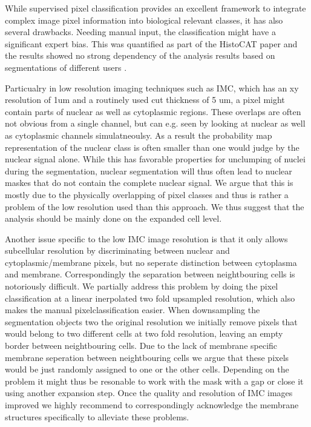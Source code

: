 \documentclass[a4paper]{article}
\begin{document}
While supervised pixel classification provides an excellent framework to integrate complex image
pixel information into biological relevant classes, it has also several drawbacks. Needing manual
input, the classification  might have a significant expert bias. This was quantified as part of the
HistoCAT paper and the results showed no strong dependency of the analysis results based on
segmentations of different users \cite{schapiro_histocat:_2017}.

Particualry in low resolution imaging techniques such as IMC, which has an xy resolution of 1um and
a routinely used cut thickness of 5 um, a pixel might contain parts of nuclear as well as
cytoplasmic regions. These overlaps are often not obvious from a single channel, but can e.g. seen
by looking at nuclear as well as cytoplasmic channels simulatneoulsy. As a result the probability
map representation of the nuclear class is often smaller than one would judge by the nuclear signal
alone. While this has favorable properties for unclumping of nuclei during the segmentation, nuclear
segmentation will thus often lead to nuclear maskes that do not contain
the complete nuclear signal. We argue that this is mostly due to the physically overlapping of
pixel classes and thus is rather a problem of the low resolution used than this approach. We thus
suggest that the analysis should be mainly done on the expanded cell level.

Another issue specific to the low IMC image resolution is that it only allows subcellular
resolution by discriminating
between nuclear and cytoplasmic/membrane pixels, but no seperate distinction between cytoplasma and
membrane. Correspondingly the separation between neightbouring cells is notoriously difficult. We
partially address this problem by doing the pixel classification at a linear inerpolated two fold
upsampled resolution, which also makes the manual pixelclassification easier. When downsampling the
segmentation objects two the original resolution we initially remove pixels that would belong to two different cells at
two fold resolution, leaving an empty border between neightbouring cells. Due to the lack of
membrane specific membrane seperation between neightbouring cells we argue that these pixels would
be just randomly assigned to one or the other cells. Depending on the problem it might thus be
resonable to work with the mask with a gap or close it using another expansion step. Once the quality and resolution of IMC
images improved we highly recommend to correspondingly acknowledge the membrane structures
specifically to alleviate these problems.
\end{document}
